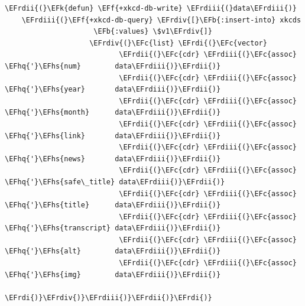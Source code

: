 \documentclass{scrartcl}
\newcommand{\EFk}[1]{\textcolor{EFk}{#1}} %
\newcommand{\EFb}[1]{\textcolor{EFb}{#1}} %
\newcommand{\EFc}[1]{\textcolor{EFc}{#1}} %
\newcommand{\EFf}[1]{\textcolor{EFf}{#1}} %
\newcommand{\EFhq}[1]{#1} %
\newcommand{\EFhs}[1]{#1} %
\newcommand{\EFrdi}[1]{#1} %
\newcommand{\EFrdii}[1]{#1} %
\newcommand{\EFrdiii}[1]{#1} %
\newcommand{\EFrdiv}[1]{#1} %
\begin{document}
\begin{Code}
\begin{Verbatim}[]
  \EFrdii{(}\EFk{defun} \EFf{+xkcd-db-write} \EFrdiii{(}data\EFrdiii{)}
    \EFrdiii{(}\EFf{+xkcd-db-query} \EFrdiv{[}\EFb{:insert-into} xkcds
                     \EFb{:values} \$v1\EFrdiv{]}
                    \EFrdiv{(}\EFc{list} \EFrdi{(}\EFc{vector}
                           \EFrdii{(}\EFc{cdr} \EFrdiii{(}\EFc{assoc} \EFhq{'}\EFhs{num}        data\EFrdiii{)}\EFrdii{)}
                           \EFrdii{(}\EFc{cdr} \EFrdiii{(}\EFc{assoc} \EFhq{'}\EFhs{year}       data\EFrdiii{)}\EFrdii{)}
                           \EFrdii{(}\EFc{cdr} \EFrdiii{(}\EFc{assoc} \EFhq{'}\EFhs{month}      data\EFrdiii{)}\EFrdii{)}
                           \EFrdii{(}\EFc{cdr} \EFrdiii{(}\EFc{assoc} \EFhq{'}\EFhs{link}       data\EFrdiii{)}\EFrdii{)}
                           \EFrdii{(}\EFc{cdr} \EFrdiii{(}\EFc{assoc} \EFhq{'}\EFhs{news}       data\EFrdiii{)}\EFrdii{)}
                           \EFrdii{(}\EFc{cdr} \EFrdiii{(}\EFc{assoc} \EFhq{'}\EFhs{safe\_title} data\EFrdiii{)}\EFrdii{)}
                           \EFrdii{(}\EFc{cdr} \EFrdiii{(}\EFc{assoc} \EFhq{'}\EFhs{title}      data\EFrdiii{)}\EFrdii{)}
                           \EFrdii{(}\EFc{cdr} \EFrdiii{(}\EFc{assoc} \EFhq{'}\EFhs{transcript} data\EFrdiii{)}\EFrdii{)}
                           \EFrdii{(}\EFc{cdr} \EFrdiii{(}\EFc{assoc} \EFhq{'}\EFhs{alt}        data\EFrdiii{)}\EFrdii{)}
                           \EFrdii{(}\EFc{cdr} \EFrdiii{(}\EFc{assoc} \EFhq{'}\EFhs{img}        data\EFrdiii{)}\EFrdii{)}
                           \EFrdi{)}\EFrdiv{)}\EFrdiii{)}\EFrdii{)}\EFrdi{)}
\end{Verbatim}
\end{Code}
\end{document}
